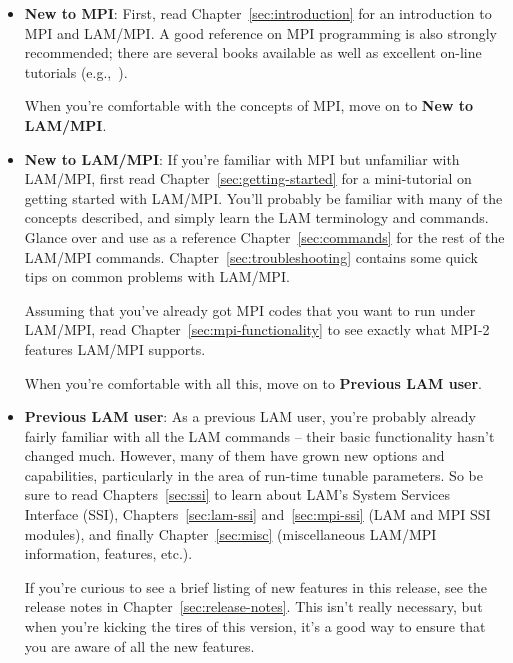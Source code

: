\begin{itemize}
\item {\bf New to MPI}: First, read Chapter~\ref{sec:introduction} for
  an introduction to MPI and LAM/MPI.  A good reference on MPI
  programming is also strongly recommended; there are several books
  available as well as excellent on-line tutorials
  (e.g.,~\cite{gropp98:_mpi2,gropp94:_using_mpi,gropp99:_using_mpi_2,snir96:_mpi_the_compl_refer}).
  
  When you're comfortable with the concepts of MPI, move on to {\bf
    New to LAM/MPI}.

  \vspace{-3pt}

\item {\bf New to LAM/MPI}: If you're familiar with MPI but unfamiliar
  with LAM/MPI, first read Chapter~\ref{sec:getting-started} for a
  mini-tutorial on getting started with LAM/MPI.  You'll probably be
  familiar with many of the concepts described, and simply learn the
  LAM terminology and commands.  Glance over and use as a reference
  Chapter~\ref{sec:commands} for the rest of the LAM/MPI commands.
  Chapter~\ref{sec:troubleshooting} contains some quick tips on common
  problems with LAM/MPI.

  Assuming that you've already got MPI codes that you want to run
  under LAM/MPI, read Chapter~\ref{sec:mpi-functionality} to see
  exactly what MPI-2 features LAM/MPI supports.
  
  When you're comfortable with all this, move on to {\bf Previous LAM
    user}.
  
  \vspace{-3pt}

\item {\bf Previous LAM user}: As a previous LAM user, you're probably
  already fairly familiar with all the LAM commands -- their basic
  functionality hasn't changed much.  However, many of them have grown
  new options and capabilities, particularly in the area of run-time
  tunable parameters.  So be sure to read Chapters~\ref{sec:ssi} to
  learn about LAM's System Services Interface (SSI),
  Chapters~\ref{sec:lam-ssi} and~\ref{sec:mpi-ssi} (LAM and MPI SSI
  modules), and finally Chapter~\ref{sec:misc} (miscellaneous LAM/MPI
  information, features, etc.).
  
  If you're curious to see a brief listing of new features in this
  release, see the release notes in Chapter~\ref{sec:release-notes}.
  This isn't really necessary, but when you're kicking the tires of
  this version, it's a good way to ensure that you are aware of all
  the new features.


\end{itemize}
